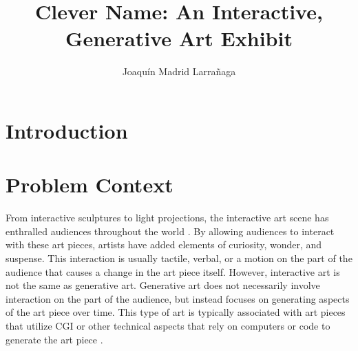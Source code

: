 \documentclass[10pt,twocolumn]{article}
\title{Clever Name: An Interactive, Generative Art Exhibit}
\author{Joaquín Madrid Larrañaga}
\affiliation{Occidental College}
\begin{document}
\maketitle

\begin{abstract}
    
\end{abstract}

\section{Introduction}

\section{Problem Context}

From interactive sculptures to light projections, the interactive art scene has enthralled audiences throughout the world \cite{sarto_disneys_2021, noauthor_teamlab_2020}. By allowing audiences to interact with these art pieces, artists have added elements of curiosity, wonder, and suspense. This interaction is usually tactile, verbal, or a motion on the part of the audience that causes a change in the art piece itself.  However, interactive art is not the same as generative art.  Generative art does not necessarily involve interaction on the part of the audience, but instead focuses on generating aspects of the art piece over time.  This type of art is typically associated with art pieces that utilize CGI or other technical aspects that rely on computers or code to generate the art piece \cite{sparacino_narrative_2002}. 
        	
\end{document}
